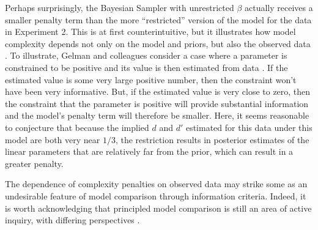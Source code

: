 \documentclass[
  english,
  man,floatsintext]{apa6}
\begin{document}
Perhaps surprisingly, the Bayesian Sampler with unrestricted \(\beta\) actually receives a smaller penalty term than the more ``restricted'' version of the model for the data in Experiment 2. This is at first counterintuitive, but it illustrates how model complexity depends not only on the model and priors, but also the observed data \autocite[see][]{gelman.etal2014}. To illustrate, Gelman and colleagues consider a case where a parameter is constrained to be positive and its value is then estimated from data \autocite*{gelman.etal2014}. If the estimated value is some very large positive number, then the constraint won't have been very informative. But, if the estimated value is very close to zero, then the constraint that the parameter is positive will provide substantial information and the model's penalty term will therefore be smaller. Here, it seems reasonable to conjecture that because the implied \(d\) and \(d'\) estimated for this data under this model are both very near \(1/3\), the restriction results in posterior estimates of the linear parameters that are relatively far from the prior, which can result in a greater penalty.

The dependence of complexity penalties on observed data may strike some as an undesirable feature of model comparison through information criteria. Indeed, it is worth acknowledging that principled model comparison is still an area of active inquiry, with differing perspectives \autocites[e.g.][]{gronau.wagenmakers2019,vehtari.etal2019}.
\end{document}
